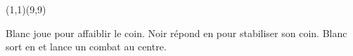 \documentclass[preview, border=0pt, varwidth=false]{standalone}
\begin{document}
	\setgounit{0.6cm} 
	
	\parbox[c][14.65cm][c]{10.2cm}{
		\centering
		\begin{psgopartialboard}{(1,1)(9,9)}
			\pass
		\end{psgopartialboard}
		
		\vspace{1em}
		Blanc joue  pour affaiblir le coin. Noir répond en  pour stabiliser son coin. Blanc sort en  et lance un combat au centre.
	}
	
\end{document}

